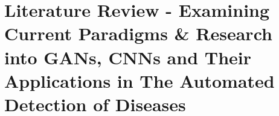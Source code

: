 \chapter{Literature Review - Examining Current Paradigms \& Research into GANs, CNNs and Their Applications in The Automated Detection of Diseases}
